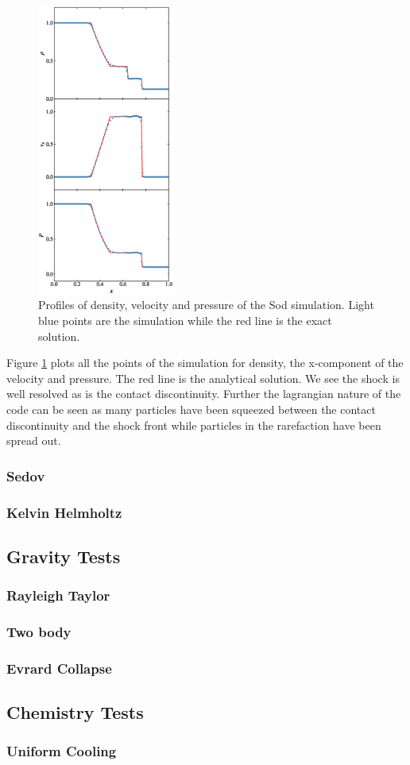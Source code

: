 \begin{figure}
    \begin{center}
        \includegraphics[width=0.4\textwidth]{figures/sod_2d.eps}
        \caption{Profiles of density, velocity and pressure of the Sod simulation. Light blue points are the simulation
        while the red line is the exact solution.}
        \label{fig.sod}
    \end{center}
\end{figure}
Figure \ref{fig.sod} plots all the points of the simulation for density, the x-component of
the velocity and pressure. The red line is the analytical solution. We see the shock is
well resolved as is the contact discontinuity. Further the lagrangian nature of the code
can be seen as many particles have been squeezed between the contact discontinuity and the
shock front while particles in the rarefaction have been spread out.

\subsubsection{Sedov}
\subsubsection{Kelvin Helmholtz}

\subsection{Gravity Tests}
\subsubsection{Rayleigh Taylor}
\subsubsection{Two body}
\subsubsection{Evrard Collapse}

\subsection{Chemistry Tests}
\subsubsection{Uniform Cooling}
